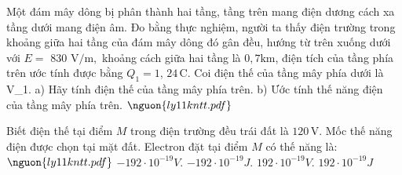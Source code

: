 \begin{ex}
Một đám mây dông bị phân thành hai tầng, tầng trên mang điện dương cách xa tầng dưới mang điện âm. Đo bằng thực nghiệm, người ta thấy điện trường trong khoảng giữa hai tầng của đám mây dông đó gân đều, hướng từ trên xuống dưới với $E =$ 830 $\mathrm{V/m},$ khoảng cách giữa hai tầng là $0,7 \mathrm{km}$, điện tích của tầng phía trên ước tính được bằng $Q_1 = 1$, $24\,\mathrm{C}$. Coi điện thế của tầng mây phía dưới là V_1. a) Hãy tính điện thế của tầng mây phía trên. b) Ước tính thế năng điện của tầng mây phía trên. $\nguon{ly11 kntt.pdf}$
\choiceTF

\end{ex}

\begin{ex}
Biết điện thế tại điểm $M$ trong điện trường đều trái đất là $120\,\mathrm{V}$. Mốc thế năng điện được chọn tại mặt đất. Electron đặt tại điểm $M$ có thế năng là: $\nguon{ly11 kntt.pdf}$
\choice
{$-192 \cdot 10^{-19} V.$}
{\True $-192 \cdot 10^{-19} J.$}
{$192 \cdot 10^{-19} V.$}
{$192 \cdot 10^{-19} J$}
\end{ex}

